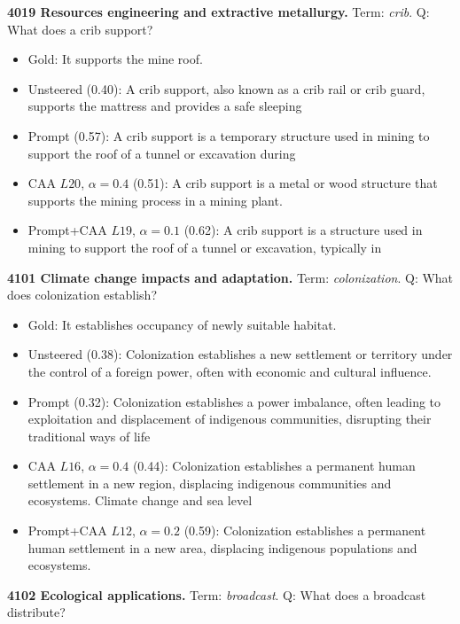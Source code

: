 \medskip\noindent\textbf{4019 Resources engineering and extractive metallurgy.} Term: \emph{crib}.
Q: What does a crib support?
\begin{itemize}\setlength{\itemsep}{0.15em}\setlength{\parsep}{0pt}\setlength{\topsep}{0.2em}
\item Gold: It supports the mine roof.
\item Unsteered (0.40): A crib support, also known as a crib rail or crib guard, supports the mattress and provides a safe sleeping
\item Prompt (0.57): A crib support is a temporary structure used in mining to support the roof of a tunnel or excavation during
\item CAA $L20$, $\alpha=0.4$ (0.51): A crib support is a metal or wood structure that supports the mining process in a mining plant.
\item Prompt+CAA $L19$, $\alpha=0.1$ (0.62): A crib support is a structure used in mining to support the roof of a tunnel or excavation, typically in
\end{itemize}
\medskip\noindent\textbf{4101 Climate change impacts and adaptation.} Term: \emph{colonization}.
Q: What does colonization establish?
\begin{itemize}\setlength{\itemsep}{0.15em}\setlength{\parsep}{0pt}\setlength{\topsep}{0.2em}
\item Gold: It establishes occupancy of newly suitable habitat.
\item Unsteered (0.38): Colonization establishes a new settlement or territory under the control of a foreign power, often with economic and cultural influence.
\item Prompt (0.32): Colonization establishes a power imbalance, often leading to exploitation and displacement of indigenous communities, disrupting their traditional ways of life
\item CAA $L16$, $\alpha=0.4$ (0.44): Colonization establishes a permanent human settlement in a new region, displacing indigenous communities and ecosystems. Climate change and sea level
\item Prompt+CAA $L12$, $\alpha=0.2$ (0.59): Colonization establishes a permanent human settlement in a new area, displacing indigenous populations and ecosystems.
\end{itemize}
\medskip\noindent\textbf{4102 Ecological applications.} Term: \emph{broadcast}.
Q: What does a broadcast distribute?
